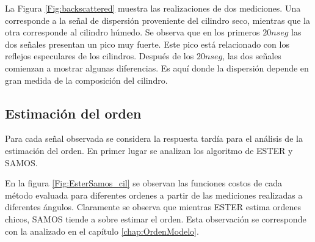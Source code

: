 	La Figura \ref{Fig:backscattered} muestra las realizaciones de dos mediciones. Una corresponde a la señal de dispersión proveniente del cilindro seco, mientras que la otra corresponde al cilindro húmedo. Se observa que en los primeros $20 nseg$ las dos señales presentan un pico muy fuerte. Este pico está relacionado con los reflejos especulares de los cilindros. Después de los $20 nseg$, las dos señales comienzan a mostrar algunas diferencias. Es aquí donde la dispersión depende en gran medida de la composición del cilindro.

    \subsection{Estimación del orden}

        Para cada señal observada se considera la respuesta tardía para el análisis de la estimación del orden. En primer lugar se analizan los algoritmo de ESTER y SAMOS. 

        En la figura \ref{Fig:EsterSamos_cil} se observan las funciones costos de cada método evaluada para diferentes ordenes a partir de las mediciones realizadas a diferentes ángulos. Claramente se observa que mientras ESTER estima ordenes chicos, SAMOS tiende a sobre estimar el orden. Esta observación se corresponde con la analizado en el capítulo \ref{chap:OrdenModelo}. 

